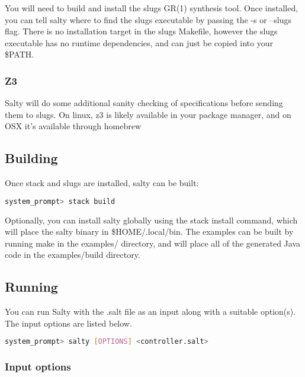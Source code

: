 You will need to build and install the slugs GR(1) synthesis tool. Once installed, you can tell salty where to find the slugs executable by passing the -s or --slugs flag. There is no installation target in the slugs Makefile, however the slugs executable has no runtime dependencies, and can just be copied into your \$PATH.

\subsubsection{Z3}

Salty will do some additional sanity checking of specifications before sending them to slugs. On linux, z3 is likely available in your package manager, and on OSX it's available through homebrew

\subsection{Building}

Once stack and slugs are installed, salty can be built:

\begin{lstlisting}[language=bash]
system_prompt> stack build
\end{lstlisting}

Optionally, you can install salty globally using the stack install command, which will place the salty binary in \$HOME/.local/bin.
The examples can be built by running make in the examples/ directory, and will place all of the generated Java code in the examples/build directory.

\subsection{Running}

You can run Salty with the .salt file as an input along with a suitable option(s). The input options are listed below.

\begin{lstlisting}[language=bash]
system_prompt> salty [OPTIONS] <controller.salt>
\end{lstlisting}

\subsubsection{Input options}

